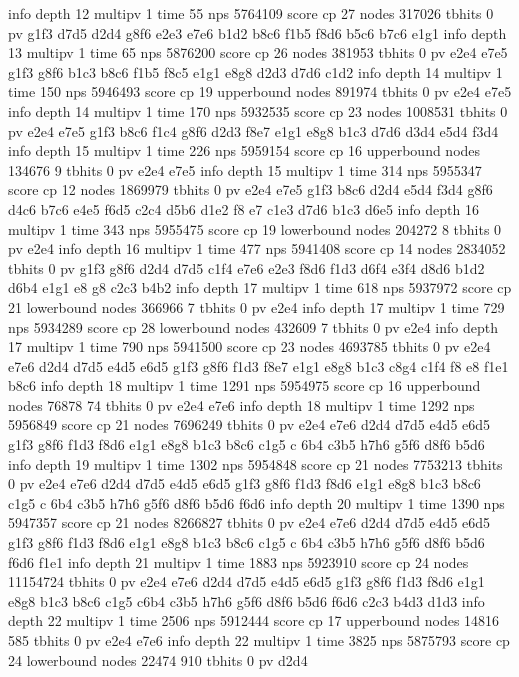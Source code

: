 info depth 12 multipv 1 time 55 nps 5764109 score cp 27 nodes 317026 tbhits 0 pv
 g1f3 d7d5 d2d4 g8f6 e2e3 e7e6 b1d2 b8c6 f1b5 f8d6 b5c6 b7c6 e1g1
info depth 13 multipv 1 time 65 nps 5876200 score cp 26 nodes 381953 tbhits 0 pv
 e2e4 e7e5 g1f3 g8f6 b1c3 b8c6 f1b5 f8c5 e1g1 e8g8 d2d3 d7d6 c1d2
info depth 14 multipv 1 time 150 nps 5946493 score cp 19 upperbound nodes 891974
 tbhits 0 pv e2e4 e7e5
info depth 14 multipv 1 time 170 nps 5932535 score cp 23 nodes 1008531 tbhits 0
pv e2e4 e7e5 g1f3 b8c6 f1c4 g8f6 d2d3 f8e7 e1g1 e8g8 b1c3 d7d6 d3d4 e5d4 f3d4
info depth 15 multipv 1 time 226 nps 5959154 score cp 16 upperbound nodes 134676
9 tbhits 0 pv e2e4 e7e5
info depth 15 multipv 1 time 314 nps 5955347 score cp 12 nodes 1869979 tbhits 0
pv e2e4 e7e5 g1f3 b8c6 d2d4 e5d4 f3d4 g8f6 d4c6 b7c6 e4e5 f6d5 c2c4 d5b6 d1e2 f8
e7 c1e3 d7d6 b1c3 d6e5
info depth 16 multipv 1 time 343 nps 5955475 score cp 19 lowerbound nodes 204272
8 tbhits 0 pv e2e4
info depth 16 multipv 1 time 477 nps 5941408 score cp 14 nodes 2834052 tbhits 0
pv g1f3 g8f6 d2d4 d7d5 c1f4 e7e6 e2e3 f8d6 f1d3 d6f4 e3f4 d8d6 b1d2 d6b4 e1g1 e8
g8 c2c3 b4b2
info depth 17 multipv 1 time 618 nps 5937972 score cp 21 lowerbound nodes 366966
7 tbhits 0 pv e2e4
info depth 17 multipv 1 time 729 nps 5934289 score cp 28 lowerbound nodes 432609
7 tbhits 0 pv e2e4
info depth 17 multipv 1 time 790 nps 5941500 score cp 23 nodes 4693785 tbhits 0
pv e2e4 e7e6 d2d4 d7d5 e4d5 e6d5 g1f3 g8f6 f1d3 f8e7 e1g1 e8g8 b1c3 c8g4 c1f4 f8
e8 f1e1 b8c6
info depth 18 multipv 1 time 1291 nps 5954975 score cp 16 upperbound nodes 76878
74 tbhits 0 pv e2e4 e7e6
info depth 18 multipv 1 time 1292 nps 5956849 score cp 21 nodes 7696249 tbhits 0
 pv e2e4 e7e6 d2d4 d7d5 e4d5 e6d5 g1f3 g8f6 f1d3 f8d6 e1g1 e8g8 b1c3 b8c6 c1g5 c
6b4 c3b5 h7h6 g5f6 d8f6 b5d6
info depth 19 multipv 1 time 1302 nps 5954848 score cp 21 nodes 7753213 tbhits 0
 pv e2e4 e7e6 d2d4 d7d5 e4d5 e6d5 g1f3 g8f6 f1d3 f8d6 e1g1 e8g8 b1c3 b8c6 c1g5 c
6b4 c3b5 h7h6 g5f6 d8f6 b5d6 f6d6
info depth 20 multipv 1 time 1390 nps 5947357 score cp 21 nodes 8266827 tbhits 0
 pv e2e4 e7e6 d2d4 d7d5 e4d5 e6d5 g1f3 g8f6 f1d3 f8d6 e1g1 e8g8 b1c3 b8c6 c1g5 c
6b4 c3b5 h7h6 g5f6 d8f6 b5d6 f6d6 f1e1
info depth 21 multipv 1 time 1883 nps 5923910 score cp 24 nodes 11154724 tbhits
0 pv e2e4 e7e6 d2d4 d7d5 e4d5 e6d5 g1f3 g8f6 f1d3 f8d6 e1g1 e8g8 b1c3 b8c6 c1g5
c6b4 c3b5 h7h6 g5f6 d8f6 b5d6 f6d6 c2c3 b4d3 d1d3
info depth 22 multipv 1 time 2506 nps 5912444 score cp 17 upperbound nodes 14816
585 tbhits 0 pv e2e4 e7e6
info depth 22 multipv 1 time 3825 nps 5875793 score cp 24 lowerbound nodes 22474
910 tbhits 0 pv d2d4
